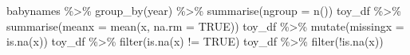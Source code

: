 \documentclass[
]{book}
\newenvironment{Shaded}{\begin{snugshade}}{\end{snugshade}}
\newcommand{\AttributeTok}[1]{\textcolor[rgb]{0.77,0.63,0.00}{#1}}
\newcommand{\ConstantTok}[1]{\textcolor[rgb]{0.00,0.00,0.00}{#1}}
\newcommand{\FunctionTok}[1]{\textcolor[rgb]{0.00,0.00,0.00}{#1}}
\newcommand{\NormalTok}[1]{#1}
\newcommand{\SpecialCharTok}[1]{\textcolor[rgb]{0.00,0.00,0.00}{#1}}
\begin{document}
\begin{Shaded}
\begin{Highlighting}[]
\NormalTok{babynames }\SpecialCharTok{\%\textgreater{}\%} \FunctionTok{group\_by}\NormalTok{(year) }\SpecialCharTok{\%\textgreater{}\%}
  \FunctionTok{summarise}\NormalTok{(}\AttributeTok{ngroup =} \FunctionTok{n}\NormalTok{())}
\NormalTok{toy\_df }\SpecialCharTok{\%\textgreater{}\%} \FunctionTok{summarise}\NormalTok{(}\AttributeTok{meanx =} \FunctionTok{mean}\NormalTok{(x, }\AttributeTok{na.rm =} \ConstantTok{TRUE}\NormalTok{))}
\NormalTok{toy\_df }\SpecialCharTok{\%\textgreater{}\%} \FunctionTok{mutate}\NormalTok{(}\AttributeTok{missingx =} \FunctionTok{is.na}\NormalTok{(x))}
\NormalTok{toy\_df }\SpecialCharTok{\%\textgreater{}\%} \FunctionTok{filter}\NormalTok{(}\FunctionTok{is.na}\NormalTok{(x) }\SpecialCharTok{!=} \ConstantTok{TRUE}\NormalTok{)}
\NormalTok{toy\_df }\SpecialCharTok{\%\textgreater{}\%} \FunctionTok{filter}\NormalTok{(}\SpecialCharTok{!}\FunctionTok{is.na}\NormalTok{(x))}
\end{Highlighting}
\end{Shaded}


  
\end{document}
